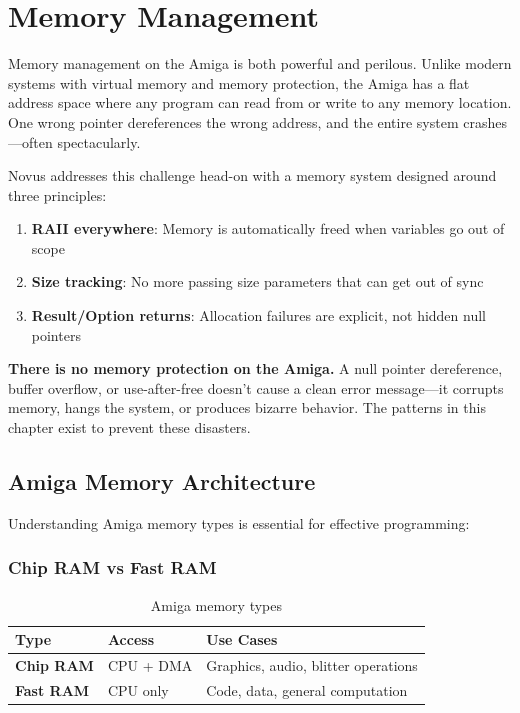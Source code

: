 \chapter{Memory Management}
\label{chap:memory}

Memory management on the Amiga is both powerful and perilous. Unlike modern systems with virtual memory and memory protection, the Amiga has a flat address space where any program can read from or write to any memory location. One wrong pointer dereferences the wrong address, and the entire system crashes---often spectacularly.

Novus addresses this challenge head-on with a memory system designed around three principles:
\begin{enumerate}
    \item \textbf{RAII everywhere}: Memory is automatically freed when variables go out of scope
    \item \textbf{Size tracking}: No more passing size parameters that can get out of sync
    \item \textbf{Result/Option returns}: Allocation failures are explicit, not hidden null pointers
\end{enumerate}

\begin{warningbox}
\textbf{There is no memory protection on the Amiga.} A null pointer dereference, buffer overflow, or use-after-free doesn't cause a clean error message---it corrupts memory, hangs the system, or produces bizarre behavior. The patterns in this chapter exist to prevent these disasters.
\end{warningbox}

\section{Amiga Memory Architecture}
\label{sec:memory-architecture}

Understanding Amiga memory types is essential for effective programming:

\subsection{Chip RAM vs Fast RAM}

\begin{table}[h]
\centering
\begin{tabular}{lll}
\textbf{Type} & \textbf{Access} & \textbf{Use Cases} \\
\hline
\textbf{Chip RAM} & CPU + DMA & Graphics, audio, blitter operations \\
\textbf{Fast RAM} & CPU only & Code, data, general computation \\
\end{tabular}
\caption{Amiga memory types}
\end{table}

